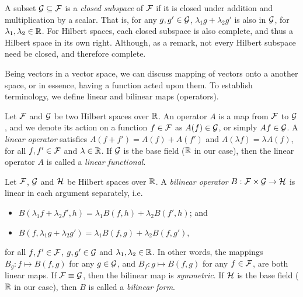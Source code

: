 A subset ${\mathcal G}\subseteq{\mathcal F}$ is a \emph{closed subspace} of ${\mathcal F}$ if it is closed under addition and multiplication by a scalar.
That is, for any $g,g'\in{\mathcal G}$, $\lambda_1 g + \lambda_2 g'$ is also in ${\mathcal G}$, for $\lambda_1,\lambda_2\in\mathbb{R}$.
For Hilbert spaces, each closed subspace is also complete, and thus a Hilbert space in its own right.
Although, as a remark, not every Hilbert subspace need be closed, and therefore complete. 

Being vectors in a vector space, we can discuss mapping of vectors onto a another space, or in essence, having a function acted upon them.
To establish terminology, we define linear and bilinear maps (operators).

\begin{definition}
  Let ${\mathcal F}$ and ${\mathcal G}$ be two Hilbert spaces over $\mathbb{R}$.
  An operator $A$ is a map from ${\mathcal F}$ to ${\mathcal G}$, and we denote its action on a function $f \in{\mathcal F}$ as $A(f) \in {\mathcal G}$, or simply $Af \in {\mathcal G}$.
  A \emph{linear operator} satisfies $A(f+f') = A(f) + A(f')$ and $A(\lambda f) = \lambda A(f)$, for all $f,f' \in{\mathcal F}$ and $\lambda\in\mathbb{R}$.
  If ${\mathcal G}$ is the base field ($\mathbb{R}$ in our case), then the linear operator $A$ is called a \emph{linear functional}.
\end{definition}

\begin{definition}
  Let ${\mathcal F}$, ${\mathcal G}$ and ${\mathcal H}$ be Hilbert spaces over $\mathbb{R}$.
  A \emph{bilinear operator} $B:{\mathcal F}\times{\mathcal G}\to{\mathcal H}$ is linear in each argument separately, i.e.
  \begin{itemize}
    \item $B(\lambda_1 f +\lambda_2 f', h) = \lambda_1 B(f,h) + \lambda_2 B(f',h)$; and
    \item $B(f, \lambda_1 g +\lambda_2 g') = \lambda_1 B(f,g) + \lambda_2 B(f,g')$,
  \end{itemize} 
  for all $f,f' \in {\mathcal F}$, $g,g' \in {\mathcal G}$ and $\lambda_1,\lambda_2\in\mathbb{R}$.
  In other words, the mappings $B_g: f \mapsto B(f,g)$ for any $g\in{\mathcal G}$, and $B_f: g \mapsto B(f,g)$ for any $f\in{\mathcal F}$, are both linear maps.
  If ${\mathcal F}\equiv{\mathcal G}$, then the bilinear map is \emph{symmetric}.
  If ${\mathcal H}$ is the base field ($\mathbb{R}$ in our case), then $B$ is called a \emph{bilinear form}.
\end{definition}

